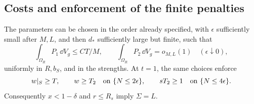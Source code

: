 \subsection{Costs and enforcement of the finite penalties}

\begin{lemma}\label{lem:ah-penalties}
The parameters can be chosen in the order already specified,
with \(\epsilon\) sufficiently small after \(M,L\), and then
\(d_*\) sufficiently large but finite, such that
\begin{equation}\label{eq:ah-penalty-costs}
 \int_{\Omega_R}P_1\,\dd V_g\le C T/M,\qquad
 \int_{\Omega_R}P_2\,\dd V_g=o_{M,L}(1)
       \quad(\epsilon\downarrow0),
\end{equation}
uniformly in \(R,b_S\), and in the strengths.
At \(t=1\), the same choices enforce
\begin{equation}\label{eq:ah-penalty-targets}
 w|_S\ge T,\qquad
 w\ge T_2\quad\hbox{on }\{N\le2\epsilon\},\qquad
 sT_2\ge1\quad\hbox{on }\{N\le4\epsilon\}.
\end{equation}
Consequently \(x<1-\delta\) and \(r\le R_s\) imply
\(\Sigma=L\).
\end{lemma}

